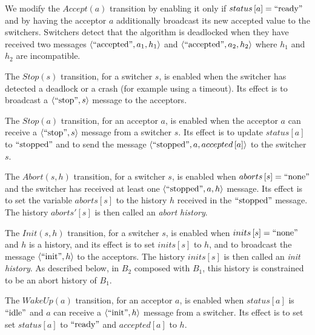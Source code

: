 \begin{compactitem}
\item We modify the $Accept\left( a \right)$ transition by enabling it only if $status\left[ a \right] = \text{``ready''}$ and by having the acceptor $a$ additionally broadcast its new accepted value to the switchers.
Switchers detect that the algorithm is deadlocked when they have received two messages $\left\langle\text{``accepted''}, a_1, h_1\right\rangle$ and $\left\langle\text{``accepted''}, a_2, h_2\right\rangle$ where  $h_1$ and $h_2$ are incompatible.

\item The $Stop\left( s \right)$ transition, for a switcher $s$, is enabled when the switcher has detected a deadlock or a crash (for example using a timeout). Its effect is to broadcast a $\left\langle\text{``stop''}, s\right\rangle$ message to the acceptors.

\item The $Stop\left( a \right)$ transition, for an acceptor $a$, is enabled when the acceptor $a$ can receive a $\left\langle\text{``stop''}, s\right\rangle$ message from a switcher $s$.
  Its effect is to update $status\left[ a \right]$ to $\text{``stopped''}$ and to send the message $\left\langle\text{``stopped''},a,accepted\left[ a \right]\right\rangle$ to the switcher $s$.

\item The $Abort\left( s, h\right)$ transition, for a switcher $s$, is enabled when $aborts\left[ s \right] = \text{``none''}$ and the switcher has received
  at least one $\left\langle\text{``stopped''}, a, h\right\rangle$ message. Its effect is to set the variable $aborts\left[ s \right]$ to the history $h$ received in the $\text{``stopped''}$ message. The history $aborts'\left[ s \right]$ is then called an \emph{abort history}. 

\item The $Init\left( s,h \right)$ transition, for a switcher $s$, is enabled when $inits\left[ s \right]=\text{``none''}$ and $h$ is a history, and its effect is to set $inits\left[ s \right]$ to $h$, and to broadcast the message $\left\langle\text{``init''}, h\right\rangle$ to the acceptors.  The history $inits\left[ s \right]$ is then called an \emph{init history}.
As described below, in $B_2$ composed with $B_1$, this history is constrained to be an abort history of $B_1$.

 \item The $WakeUp\left( a \right)$ transition, for an acceptor $a$, is enabled when $status\left[ a \right]$ is $\text{``idle''}$ and $a$ can receive a $\left\langle\text{``init''}, h\right\rangle$ message from a switcher. Its effect is to set set $status\left[ a \right]$ to $\text{``ready''}$ and $accepted\left[ a \right]$ to $h$.

\end{compactitem}


